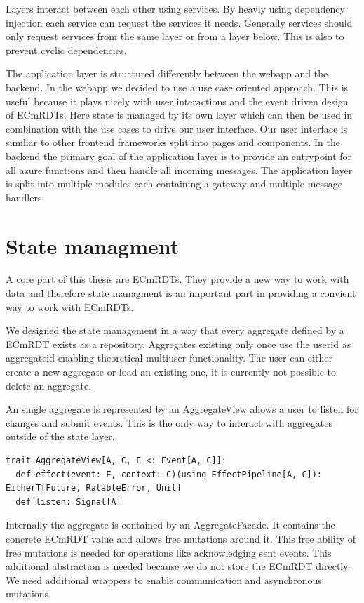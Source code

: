 \documentclass[
	ngerman,
	ruledheaders=section,   %
	class=report,		    %
	thesis={type=bachelor}, %
	accentcolor=9c,			%
	custommargins=true,    %
	marginpar=false,        %
	parskip=half-,          %
	fontsize=11pt,          %
]{tudapub}
\begin{document}
Layers interact between each other using services. By heavly using dependency injection each service can request the services it needs. Generally services should only request services from the same layer or from a layer below. This is also to prevent cyclic dependencies. 

The application layer is structured differently between the webapp and the backend. In the webapp we decided to use a use case oriented approach. This is useful because it plays nicely with user interactions and the event driven design of ECmRDTs. Here state is managed by its own layer which can then be used in combination with the use cases to drive our user interface. Our user interface is similiar to other frontend frameworks split into pages and components. In the backend the primary goal of the application layer is to provide an entrypoint for all azure functions and then handle all incoming messages. The application layer is split into multiple modules each containing a gateway and multiple message handlers.

\section{State managment}
A core part of this thesis are ECmRDTs. They provide a new way to work with data and therefore state managment is an important part in providing a convient way to work with ECmRDTs. 

We designed the state management in a way that every aggregate defined by a ECmRDT exists as a repository. Aggregates existing only once use the userid as aggregateid enabling theoretical multiuser functionality. The user can either create a new aggregate or load an existing one, it is currently not possible to delete an aggregate. 

An single aggregate is represented by an AggregateView allows a user to listen for changes and submit events. This is the only way to interact with aggregates outside of the state layer.

\begin{lstlisting}
trait AggregateView[A, C, E <: Event[A, C]]:
  def effect(event: E, context: C)(using EffectPipeline[A, C]): EitherT[Future, RatableError, Unit]
  def listen: Signal[A]
\end{lstlisting}

Internally the aggregate is contained by an AggregateFacade. It contains the concrete ECmRDT value and allows free mutations around it. This free ability of free mutations is needed for operations like acknowledging sent events. This additional abstraction is needed because we do not store the ECmRDT directly. We need additional wrappers to enable communication and asynchronous mutations. 
\end{document}

